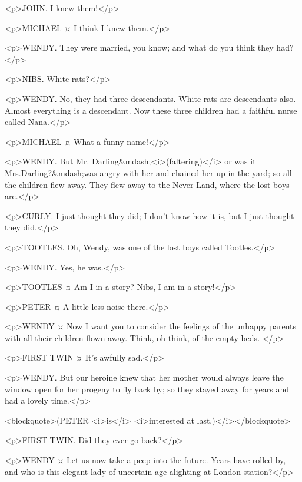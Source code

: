 <p>JOHN. I knew them!</p>

<p>MICHAEL ¤
I think I knew them.</p>

<p>WENDY. They were married, you know; and what do you think they had?</p>

<p>NIBS. White rats?</p>

<p>WENDY. No, they had three descendants. White rats are descendants also. Almost everything is a descendant. Now these three children had a faithful nurse called Nana.</p>

<p>MICHAEL ¤
What a funny name!</p>

<p>WENDY. But Mr. Darling&mdash;<i>(faltering)</i> or was it Mrs.Darling?&mdash;was angry with her and chained her up in the yard; so all the children flew away. They flew away to the Never Land, where the lost boys are.</p>

<p>CURLY. I just thought they did; I don't know how it is, but I just thought they did.</p>

<p>TOOTLES. Oh, Wendy, was one of the lost boys called Tootles.</p>

<p>WENDY. Yes, he was.</p>

<p>TOOTLES ¤
Am I in a story? Nibs, I am in a story!</p>

<p>PETER ¤
A little less noise there.</p>

<p>WENDY ¤
Now I want you to consider the feelings of the unhappy parents with all their children flown away. Think, oh think, of the empty beds.
</p>

<p>FIRST TWIN ¤
It's awfully sad.</p>

<p>WENDY. But our heroine knew that her mother would always leave the window open for her progeny to fly back by; so they stayed away for years and had a lovely time.</p>

<blockquote>(PETER <i>is</i> <i>interested at last.)</i></blockquote>

<p>FIRST TWIN. Did they ever go back?</p>

<p>WENDY ¤
Let us now take a peep into the future. Years have rolled by, and who is this elegant lady of uncertain age alighting at London station?</p>

